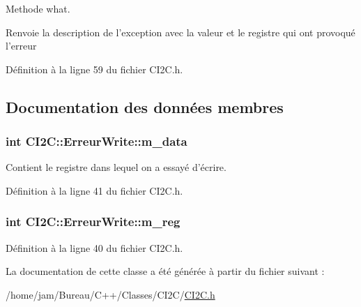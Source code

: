 Methode what. 

\begin{DoxyReturn}{Renvoie}
la description de l'exception avec la valeur et le registre qui ont provoqué l'erreur 
\end{DoxyReturn}


Définition à la ligne 59 du fichier C\+I2\+C.\+h.



\subsection{Documentation des données membres}
\hypertarget{class_c_i2_c_1_1_erreur_write_a3ba1d239d00892177274b494e987862b}{
\subsubsection[{m\+\_\+data}]{\setlength{\rightskip}{0pt plus 5cm}int C\+I2\+C\+::\+Erreur\+Write\+::m\+\_\+data\hspace{0.3cm}{\ttfamily [private]}}}\label{class_c_i2_c_1_1_erreur_write_a3ba1d239d00892177274b494e987862b}


Contient le registre dans lequel on a essayé d'écrire. 



Définition à la ligne 41 du fichier C\+I2\+C.\+h.

\hypertarget{class_c_i2_c_1_1_erreur_write_a0271678b0343dd18ad8113ab3dd579d2}{
\subsubsection[{m\+\_\+reg}]{\setlength{\rightskip}{0pt plus 5cm}int C\+I2\+C\+::\+Erreur\+Write\+::m\+\_\+reg\hspace{0.3cm}{\ttfamily [private]}}}\label{class_c_i2_c_1_1_erreur_write_a0271678b0343dd18ad8113ab3dd579d2}


Définition à la ligne 40 du fichier C\+I2\+C.\+h.



La documentation de cette classe a été générée à partir du fichier suivant \+:\begin{DoxyCompactItemize}
\item 
/home/jam/\+Bureau/\+C++/\+Classes/\+C\+I2\+C/\hyperlink{_c_i2_c_8h}{C\+I2\+C.\+h}\end{DoxyCompactItemize}
